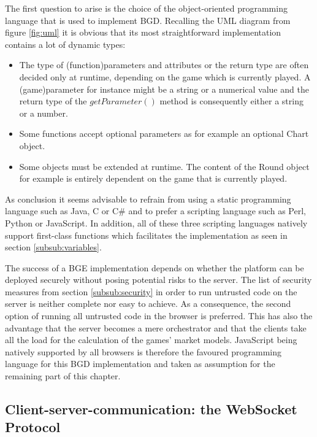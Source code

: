 The first question to arise is the choice of the object-oriented programming language that is used to implement BGD. Recalling the UML diagram from figure \ref{fig:uml} it is obvious that its most straightforward implementation contains a lot of dynamic types:
\begin{itemize}
\item The type of (function)parameters and attributes or the return type are often decided only at runtime, depending on the game which is currently played. A (game)parameter for instance might be a string or a numerical value and the return type of the \newline $getParameter()$ method is consequently either a string or a number.
\item Some functions accept optional parameters as for example an optional Chart object.
\item Some objects must be extended at runtime. The content of the Round object for example is entirely dependent on the game that is currently played.
\end{itemize}
As conclusion it seems advisable to refrain from using a static programming language such as Java, C or C\# and to prefer a scripting language such as Perl, Python or JavaScript. In addition, all of these three scripting languages natively support first-class functions which facilitates the implementation as seen in section \ref{subsub:variables}.

 The success of a BGE implementation depends on whether the platform can be deployed securely without posing potential risks to the server. The list of security measures from section \ref{subsub:security} in order to run untrusted code on the server is neither complete nor easy to achieve. As a consequence, the second option of running all untrusted code in the browser is preferred. This has also the advantage that the server becomes a mere orchestrator and that the clients take all the load for the calculation of the games' market models. JavaScript being natively supported by all browsers is therefore the favoured programming language for this BGD implementation and taken as assumption for the remaining part of this chapter.
 
\subsection{Client-server-communication: the WebSocket Protocol}
\label{sub:imp:cs}

